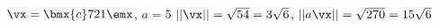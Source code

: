 {$\vx = \bmx{c} 7\\2\\1\emx$, $a = 5$
}
{$||\vx|| = \sqrt{54} = 3\sqrt{6}$, $||a\vx|| = \sqrt{270} = 15\sqrt{6}$
}